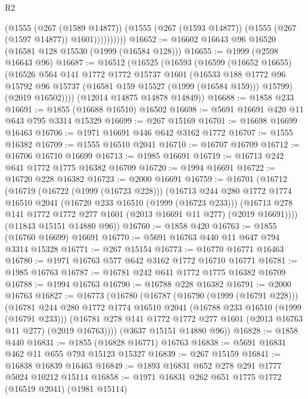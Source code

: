 \begin{lexlean}{R2}
\begin{coremodule}
                  (@1555
                    (@267 (@1589 @14877))
                    (@1555 (@267 (@1593 @14877)) (@1555 (@267 (@1597 @14877)) @1601))))))))))
@16652 := @16602 @16643 @96 @16520 (@16581 @128 @15530 (@1999 (@16584 @128)))
@16655 := @1999 (@2598 @16643 @96)
@16687 := @16512
    (@16525
      (@16593
        (@16599
          (@16652 @16655)
          (@16526
            @564
            @141
            @1772
            @1772
            @15737
            @1601
            (@16533
              @188
              @1772
              @96
              @15792
              @96
              @15737
              (@16581 @159 @15527 (@1999 (@16584 @159)))
              @15799)
            (@2019 @16502))))
      (@12014 @14875 @14878 @14849))
@16688 := @1858 @233
@16691 := @1855 (@16688 @16510) @16502
@16698 := @5691 @16691 @420 @11 @643 @795 @3314 @15329
@16699 := @267 @15169
@16701 := @16698 @16699 @16463
@16706 := @1971 @16691 @446 @642 @3162 @1772
@16707 := @1555 @16382
@16709 := @1555 @16510 @2041
@16710 := @16707 @16709
@16712 := @16706 @16710 @16699
@16713 := @1985 @16691
@16719 := @16713 @242 @641 @1772 @1775 @16382 @16709
@16720 := @1994 @16691
@16722 := @16720 @228 @16382
@16723 := @2000 @16691
@16759 := @16701
    (@16712
      (@16719
        (@16722 (@1999 (@16723 @228)))
        (@16713
          @244
          @280
          @1772
          @1774
          @16510
          @2041
          (@16720 @233 @16510 (@1999 (@16723 @233)))
          (@16713 @278 @141 @1772 @1772 @277 @1601 (@2013 @16691 @11 @277) (@2019 @16691))))
      (@11843 @15151 @14880 @96))
@16760 := @1858 @420
@16763 := @1855 (@16760 @16699) @16691
@16770 := @5691 @16763 @440 @11 @647 @794 @3314 @15328
@16771 := @267 @15154
@16773 := @16770 @16771 @16463
@16780 := @1971 @16763 @577 @642 @3162 @1772 @16710 @16771
@16781 := @1985 @16763
@16787 := @16781 @242 @641 @1772 @1775 @16382 @16709
@16788 := @1994 @16763
@16790 := @16788 @228 @16382
@16791 := @2000 @16763
@16827 := @16773
    (@16780
      (@16787
        (@16790 (@1999 (@16791 @228)))
        (@16781
          @244
          @280
          @1772
          @1774
          @16510
          @2041
          (@16788 @233 @16510 (@1999 (@16791 @233)))
          (@16781 @278 @141 @1772 @1772 @277 @1601 (@2013 @16763 @11 @277) (@2019 @16763))))
      (@3637 @15151 @14880 @96))
@16828 := @1858 @440
@16831 := @1855 (@16828 @16771) @16763
@16838 := @5691 @16831 @462 @11 @655 @793 @15123 @15327
@16839 := @267 @15159
@16841 := @16838 @16839 @16463
@16849 := @1893 @16831 @652 @278 @291 @1777 @5024 @10212 @15114
@16858 := @1971 @16831 @262 @651 @1775 @1772 (@16519 @2041) (@1981 @15114)

\end{coremodule}
\end{lexlean}
